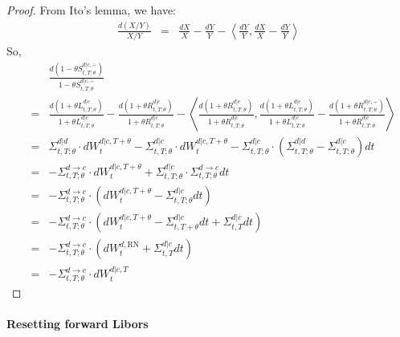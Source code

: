 \documentclass[11pt,english]{amsart}
\newcommand{\RN}{\mathrm{RN}}
\theoremstyle{definition}
\begin{document}
\begin{proof}
From Ito's lemma, we have:
\begin{eqnarray*}
	\frac{d(X/Y)}{X/Y} 
	&=&  \frac{dX}{X} -  \frac{dY}{Y} 
	- \left\langle  \frac{dY}{Y}    ,  \frac{dX}{X} -  \frac{dY}{Y}  \right\rangle 
\end{eqnarray*} 
So, 
\begin{eqnarray*}
	& & \frac{d(1 - \theta S^{d|c,\div}_{t,T;\theta})}{1 - \theta S^{d|c,\div}_{t,T;\theta}} \\
	&=&  \frac{d(1+\theta L^{d|c}_{t,T;\theta})}{1+\theta L^{d|c}_{t,T;\theta}} 
	-  \frac{d(1+\theta R^{d|c}_{t,T;\theta})}{1+\theta R^{d|c}_{t,T;\theta}} 
	- \left\langle   \frac{d(1+\theta R^{d|c}_{t,T;\theta})}{1+\theta R^{d|c}_{t,T;\theta}}   ,  \frac{d(1+\theta L^{d|c}_{t,T;\theta})}{1+\theta L^{d|c}_{t,T;\theta}}  -  \frac{d(1+\theta R^{d|c,\div}_{t,T;\theta})}{1+\theta R^{d|c}_{t,T;\theta}} \right\rangle \\
	&=& \Sigma^{d|d}_{t,T;\theta} \cdot dW^{d|c,T+\theta}_t -
	 \Sigma^{d|c}_{t,T;\theta} \cdot dW^{d|c,T+\theta}_t - \Sigma^{d|c}_{t,T;\theta}\cdot (\Sigma^{d|d}_{t,T;\theta} - \Sigma^{d|c}_{t,T;\theta})dt \\
	&=& -\Sigma^{d\to c}_{t,T;\theta} \cdot dW^{d|c,T+\theta}_t + \Sigma^{d|c}_{t,T;\theta}\cdot \Sigma^{d\to c}_{t,T;\theta} dt \\
	&=& -\Sigma^{d\to c}_{t,T;\theta} \cdot \left( dW^{d|c,T+\theta}_t - \Sigma^{d|c}_{t,T;\theta} dt\right) \\
	&=& -\Sigma^{d\to c}_{t,T;\theta} \cdot \left( dW^{d|c,T+\theta}_t - \Sigma^{d|c}_{t,T+\theta}dt + \Sigma^{d|c}_{t,T} dt\right) \\
	&=& -\Sigma^{d\to c}_{t,T;\theta} \cdot \left( dW^{d,\RN}_t + \Sigma^{d|c}_{t,T} dt\right) \\
	&=& -\Sigma^{d\to c}_{t,T;\theta} \cdot dW^{d|c,T}_t 
\end{eqnarray*} 
\end{proof}




\paragraph{Resetting forward Libors}
\end{document}
